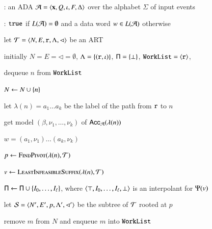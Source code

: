 \documentclass[10pt,conference,letterpaper,twocolumn]{IEEEtran}
\begin{document}
\begin{algorithm}[t!]
{\scriptsize\begin{algorithmic}[0]
: an ADA $\mathcal{A} = \left\langle \mathbf x,Q,\iota,F,\Delta \right\rangle$
over the alphabet $\Sigma$ of input events

: $\mathtt{true}$ if $L(\mathcal{A})=\emptyset$ and a data word $w
\in L(\mathcal{A})$ otherwise
\end{algorithmic}}

{\scriptsize\begin{algorithmic}[1] 

  \State let $\mathcal{T} = \left\langle N,E,\mathtt{r},\Lambda,\lhd \right\rangle$ be an ART

  \State initially $N = E = \lhd = \emptyset$, $\Lambda =
  \left\{ (\mathtt{r},\iota) \right\}$, $\mathsf{\Pi} = \left\{ \bot \right\}$, $\mathtt{WorkList} =
  \left\langle \mathtt{r} \right\rangle$,

  \While {$\worklist \neq \emptyset$}
  \label{ln:while}
  
  \State dequeue $n$ from $\mathtt{WorkList}$ 

  \State $N \leftarrow N \cup \left\{ n \right\}$

  \State let $\lambda(n) = a_1\ldots a_k$ be the label of the path from
  $\mathtt{r}$ to $n$ 

   

   
  \label{ln:feasible}

  \State get model $(\beta,\nu_1,\ldots,\nu_k)$ of
  $\mathsf{Acc}_{\mathcal{A}}(\lambda(n))$

   $w = (a_1,\nu_1) \ldots (a_k,\nu_k)$
  \label{ln:cex}

  \Else {}

  \State $p \leftarrow \Call{FindPivot}{\lambda(n),\Art}$
  \label{ln:pivot}

  \State $v \leftarrow \Call{LeastInfeasibleSuffix}{\lambda(n),\Art}$
  
  \State $\mathsf{\Pi} \leftarrow \mathsf{\Pi} \cup \left\{ I_0,\ldots,I_\ell \right\}$,
  where $\left\langle \top,I_0,\ldots,I_\ell,\bot \right\rangle$ is an interpolant for
  $\Psi(v)$

  \State let $\mathcal{S} = \left\langle N',E',p,\Lambda',\lhd' \right\rangle$ be the subtree
  of $\mathcal{T}$ rooted at $p$


  \State remove $m$ from $N$ and enqueue $m$ into $\mathtt{WorkList}$


\end{algorithmic}}
\end{algorithm}
\end{document}
